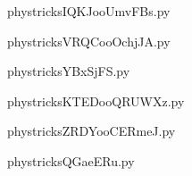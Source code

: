     \newcommand{\CaptionFigIQKJooUmvFBs}{<+Type your caption here+>}
    \begin{center}
        
    \end{center}
    phystricksIQKJooUmvFBs.py

    

    \clearpage
    


    \newcommand{\CaptionFigVRQCooOchjJA}{<+Type your caption here+>}
    \begin{center}
        
    \end{center}
    phystricksVRQCooOchjJA.py

    

    \clearpage
    


    \newcommand{\CaptionFigYBxSjFS}{<+Type your caption here+>}
    \begin{center}
        
    \end{center}
    phystricksYBxSjFS.py

    

    \clearpage
    


    \newcommand{\CaptionFigKTEDooQRUWXz}{<+Type your caption here+>}
    \begin{center}
        
    \end{center}
    phystricksKTEDooQRUWXz.py

    

    \clearpage
    


    \newcommand{\CaptionFigZRDYooCERmeJ}{<+Type your caption here+>}
    \begin{center}
        
    \end{center}
    phystricksZRDYooCERmeJ.py

    

    \clearpage
    


    \newcommand{\CaptionFigQGaeERu}{<+Type your caption here+>}
    \begin{center}
        
    \end{center}
    phystricksQGaeERu.py

